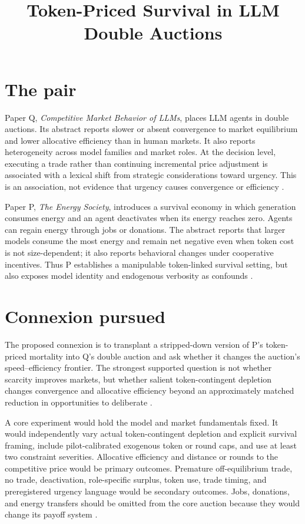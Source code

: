 \documentclass{article}
\title{Token-Priced Survival in LLM Double Auctions}
\begin{document}
\maketitle

\section{The pair}

Paper Q, \emph{Competitive Market Behavior of LLMs}, places LLM agents in double auctions.  Its abstract reports slower or absent convergence to market equilibrium and lower allocative efficiency than in human markets.  It also reports heterogeneity across model families and market roles.  At the decision level, executing a trade rather than continuing incremental price adjustment is associated with a lexical shift from strategic considerations toward urgency.  This is an association, not evidence that urgency causes convergence or efficiency .

Paper P, \emph{The Energy Society}, introduces a survival economy in which generation consumes energy and an agent deactivates when its energy reaches zero.  Agents can regain energy through jobs or donations.  The abstract reports that larger models consume the most energy and remain net negative even when token cost is not size-dependent; it also reports behavioral changes under cooperative incentives.  Thus P establishes a manipulable token-linked survival setting, but also exposes model identity and endogenous verbosity as confounds .

\section{Connexion pursued}

The proposed connexion is to transplant a stripped-down version of P's token-priced mortality into Q's double auction and ask whether it changes the auction's speed--efficiency frontier.  The strongest supported question is not whether scarcity improves markets, but whether salient token-contingent depletion changes convergence and allocative efficiency beyond an approximately matched reduction in opportunities to deliberate .

A core experiment would hold the model and market fundamentals fixed.  It would independently vary actual token-contingent depletion and explicit survival framing, include pilot-calibrated exogenous token or round caps, and use at least two constraint severities.  Allocative efficiency and distance or rounds to the competitive price would be primary outcomes.  Premature off-equilibrium trade, no trade, deactivation, role-specific surplus, token use, trade timing, and preregistered urgency language would be secondary outcomes.  Jobs, donations, and energy transfers should be omitted from the core auction because they would change its payoff system .
\end{document}
